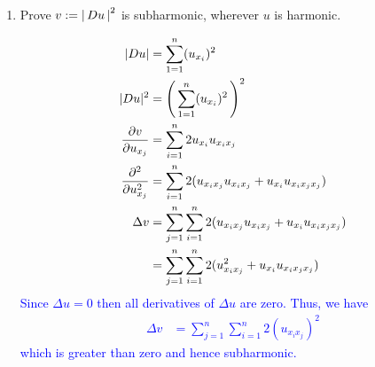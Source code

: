 \documentclass[10pt,a4paper]{report}
\newcommand{\BLUE}[1]{\textcolor{blue}{#1}}
\begin{document}
\begin{description}
\begin{enumerate}
\begin{enumerate}[label=(\alph*)]
			\item[(d)] Prove $v := \left |\, Du \,\right |^2$ is subharmonic, wherever $u$ is harmonic.
			
			\BLUE{\begin{align*}
				|Du| &= \sum_{1=1}^n (u_{x_i})^2 \\
				|Du|^2 &= \left (\, \sum_{1=1}^n (u_{x_i})^2 \,\right )^2 \\
				\frac{\partial v}{\partial u_{x_j}} &= \sum_{i=1}^n 2u_{x_i}u_{x_ix_j} \\
				\frac{\partial^2 }{\partial u_{x_j}^2} &= \sum_{i=1}^n 2(u_{x_ix_j}u_{x_ix_j}+u_{x_i}u_{x_ix_jx_j}) \\
				\Delta v &= \sum_{j=1}^n \sum_{i=1}^n 2(u_{x_ix_j}u_{x_ix_j}+u_{x_i}u_{x_ix_jx_j}) \\
				&= \sum_{j=1}^n \sum_{i=1}^n 2(u_{x_ix_j}^2+u_{x_i}u_{x_ix_jx_j})
			\end{align*}Since $\Delta u=0$ then all derivatives of $\Delta u$ are zero. Thus, we have
			\begin{align*}
				\Delta v &= \sum_{j=1}^n \sum_{i=1}^n 2(u_{x_ix_j})^2
			\end{align*}which is greater than zero and hence subharmonic.
			}
		
		\end{enumerate}
	\end{enumerate}
\end{description}
\end{document}

